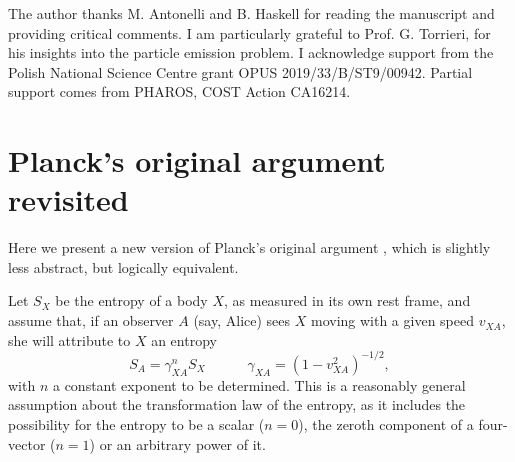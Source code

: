 \documentclass[twocolumn,usenatbib]{mnras2}
\newcommand{\spc}{\quad \quad \quad}
\begin{document}
 The author thanks M. Antonelli and B. Haskell for reading the manuscript and providing critical comments. I am particularly grateful to Prof. G. Torrieri, for his insights into the particle emission problem. I acknowledge support from the Polish National Science Centre grant OPUS 2019/33/B/ST9/00942. Partial support comes from PHAROS, COST Action CA16214.


\appendix

\section{Planck's original argument revisited}\label{AAA}

Here we present a new version of Planck's original argument \citep{Planck_1908}, which is slightly less abstract, but logically equivalent. 

Let $S_X$ be the entropy of a body $X$, as measured in its own rest frame, and assume that, if an observer $A$ (say, Alice) sees $X$ moving with a given speed $v_{XA}$, she will attribute to $X$ an entropy 
\begin{equation}
S_A = \gamma^n_{XA} S_X  \spc  \gamma_{XA}= (1-v_{XA}^2)^{-1/2},
\end{equation} 
with $n$ a constant exponent to be determined. This is a reasonably general assumption about the transformation law of the entropy, as it includes the possibility for the entropy to be a scalar ($n=0$), the zeroth component of a four-vector ($n=1$) or an arbitrary power of it.
\end{document}
